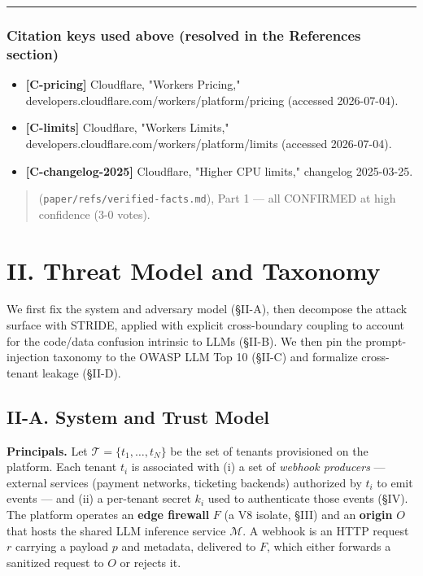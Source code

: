\begin{center}\rule{0.5\linewidth}{0.5pt}\end{center}

\subsubsection{Citation keys used above (resolved in the References
section)}\label{citation-keys-used-above-resolved-in-the-references-section}

\begin{itemize}
\tightlist
\item
  \textbf{{[}C-pricing{]}} Cloudflare, "Workers Pricing,"
  developers.cloudflare.com/workers/platform/pricing (accessed
  2026-07-04).
\item
  \textbf{{[}C-limits{]}} Cloudflare, "Workers Limits,"
  developers.cloudflare.com/workers/platform/limits (accessed
  2026-07-04).
\item
  \textbf{{[}C-changelog-2025{]}} Cloudflare, "Higher CPU limits,"
  changelog 2025-03-25.
\end{itemize}

\begin{quote}
(\passthrough{\lstinline!paper/refs/verified-facts.md!}), Part 1 --- all
CONFIRMED at high confidence (3-0 votes).
\end{quote}

\section{II. Threat Model and
Taxonomy}\label{ii-threat-model-and-taxonomy}

We first fix the system and adversary model (§II-A), then decompose the
attack surface with STRIDE, applied with explicit cross-boundary
coupling to account for the code/data confusion intrinsic to LLMs
(§II-B). We then pin the prompt-injection taxonomy to the OWASP LLM Top
10 (§II-C) and formalize cross-tenant leakage (§II-D).

\subsection{II-A. System and Trust
Model}\label{ii-a-system-and-trust-model}

\textbf{Principals.} Let \(\mathcal{T} = \{t_1, \dots, t_N\}\) be the
set of tenants provisioned on the platform. Each tenant \(t_i\) is
associated with (i) a set of \emph{webhook producers} --- external
services (payment networks, ticketing backends) authorized by \(t_i\) to
emit events --- and (ii) a per-tenant secret \(k_i\) used to
authenticate those events (§IV). The platform operates an \textbf{edge
firewall} \(F\) (a V8 isolate, §III) and an \textbf{origin} \(O\) that
hosts the shared LLM inference service \(\mathcal{M}\). A webhook is an
HTTP request \(r\) carrying a payload \(p\) and metadata, delivered to
\(F\), which either forwards a sanitized request to \(O\) or rejects it.


